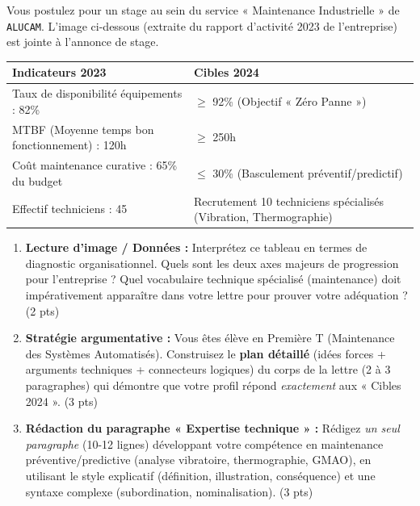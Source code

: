 \documentclass[11pt]{article}
\begin{document}
\begin{exercice}
Vous postulez pour un stage au sein du service « Maintenance Industrielle » de \texttt{ALUCAM}. L'image ci-dessous (extraite du rapport d'activité 2023 de l'entreprise) est jointe à l'annonce de stage.

\begin{center}
\begin{tabular}{|p{5cm}|p{5cm}|}
\hline
\textbf{Indicateurs 2023} & \textbf{Cibles 2024} \\
\hline
Taux de disponibilité équipements : 82\% & $\geq$ 92\% (Objectif « Zéro Panne ») \\
MTBF (Moyenne temps bon fonctionnement) : 120h & $\geq$ 250h \\
Coût maintenance curative : 65\% du budget & $\leq$ 30\% (Basculement préventif/predictif) \\
Effectif techniciens : 45 & Recrutement 10 techniciens spécialisés (Vibration, Thermographie) \\
\hline
\end{tabular}
\end{center}

\begin{enumerate}
    \item \textbf{Lecture d'image / Données :} Interprétez ce tableau en termes de diagnostic organisationnel. Quels sont les deux axes majeurs de progression pour l'entreprise ? Quel vocabulaire technique spécialisé (maintenance) doit impérativement apparaître dans votre lettre pour prouver votre adéquation ? \hfill (2 pts)
    \item \textbf{Stratégie argumentative :} Vous êtes élève en Première T (Maintenance des Systèmes Automatisés). Construisez le \textbf{plan détaillé} (idées forces + arguments techniques + connecteurs logiques) du corps de la lettre (2 à 3 paragraphes) qui démontre que votre profil répond \textit{exactement} aux « Cibles 2024 ». \hfill (3 pts)
    \item \textbf{Rédaction du paragraphe « Expertise technique » :} Rédigez \textit{un seul paragraphe} (10-12 lignes) développant votre compétence en maintenance préventive/predictive (analyse vibratoire, thermographie, GMAO), en utilisant le style explicatif (définition, illustration, conséquence) et une syntaxe complexe (subordination, nominalisation). \hfill (3 pts)
\end{enumerate}
\end{exercice}
\end{document}
